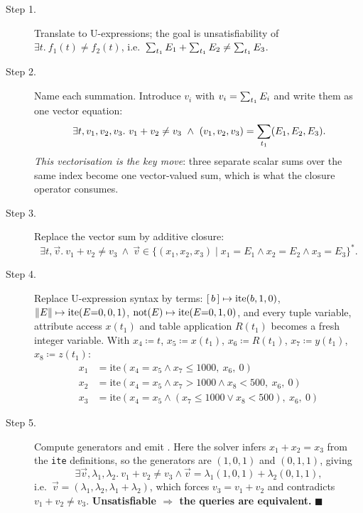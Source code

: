 \begin{description}
\item[Step 1.] Translate to U-expressions; the goal is unsatisfiability of
  $\exists t.\ f_1(t)\neq f_2(t)$, i.e.\ $\sum_{t_1}E_1+\sum_{t_1}E_2\neq\sum_{t_1}E_3$.

\item[Step 2.] Name each summation. Introduce $v_i$ with $v_i=\sum_{t_1}E_i$ and write them
  as one vector equation:
  \[
  \exists t,v_1,v_2,v_3.\ v_1+v_2\neq v_3 \ \wedge\ (v_1,v_2,v_3)=\usum{t_1}(E_1,E_2,E_3).
  \]
  \emph{This vectorisation is the key move}: three separate scalar sums over the same index
  become one vector-valued sum, which is what the closure operator consumes.

\item[Step 3.] Replace the vector sum by additive closure:
  \[
  \exists t,\vec v.\ v_1+v_2\neq v_3\ \wedge\ \vec v\in\{(x_1,x_2,x_3)\mid x_1{=}E_1\wedge x_2{=}E_2\wedge x_3{=}E_3\}^*.
  \]

\item[Step 4.] Replace U-expression syntax by \lia{} terms: $[\,b\,]\mapsto\mathrm{ite}(b,1,0)$,
  $\left\lVert E \right\rVert\mapsto\mathrm{ite}(E{=}0,0,1)$, $\mathrm{not}(E)\mapsto\mathrm{ite}(E{=}0,1,0)$, and every
  tuple variable, attribute access $x(t_1)$ and table application $R(t_1)$ becomes a fresh
  integer variable. With $x_4\coloneqq t$, $x_5\coloneqq x(t_1)$, $x_6\coloneqq R(t_1)$,
  $x_7\coloneqq y(t_1)$, $x_8\coloneqq z(t_1)$:
  \[
  \begin{aligned}
  x_1&=\mathrm{ite}(x_4{=}x_5\wedge x_7{\le}1000,\ x_6,\ 0)\\
  x_2&=\mathrm{ite}(x_4{=}x_5\wedge x_7{>}1000\wedge x_8{<}500,\ x_6,\ 0)\\
  x_3&=\mathrm{ite}(x_4{=}x_5\wedge (x_7{\le}1000\vee x_8{<}500),\ x_6,\ 0)
  \end{aligned}
  \]

\item[Step 5.] Compute generators and emit \lia{}. Here the solver infers $x_1+x_2=x_3$ from
  the \texttt{ite} definitions, so the generators are $(1,0,1)$ and $(0,1,1)$, giving
  \[
  \exists \vec v,\lambda_1,\lambda_2.\ v_1+v_2\neq v_3\wedge \vec v=\lambda_1(1,0,1)+\lambda_2(0,1,1),
  \]
  i.e.\ $\vec v=(\lambda_1,\lambda_2,\lambda_1{+}\lambda_2)$, which forces $v_3=v_1+v_2$ and
  contradicts $v_1+v_2\neq v_3$. \textbf{Unsatisfiable $\Rightarrow$ the queries are
  equivalent.} $\blacksquare$
\end{description}

